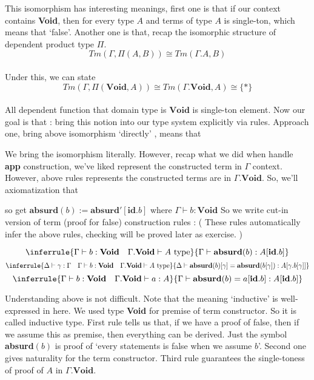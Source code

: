 \documentclass[12pt, a4paper, openany, twoside]{book}
\theoremstyle{definition}
\theoremstyle{remark}
\theoremstyle{plain}
\numberwithin{equation}{section}
\begin{document}
This isomorphism has interesting meanings, first one is that if our context contains \textbf{Void}, 
then for every type $A$ and terms of type $A$ is single-ton, which means that \lq false'. 
Another one is that, recap the isomorphic structure of dependent product type $\Pi$. 
\[Tm(\Gamma, \Pi(A, B)) \cong Tm(\Gamma.A, B)\]
\\
Under this, we can state 
\[Tm(\Gamma, \Pi(\mathbf{Void}, A)) \cong Tm(\Gamma.\mathbf{Void}, A) \cong \{*\}\]
\\
All dependent function that domain type is $\mathbf{Void}$ is single-ton element. 
Now our goal is that : bring this notion into our type system explicitly via rules. Approach one, 
bring above isomorphism \lq directly' , means that 
We bring the isomorphism literally. However, recap what we did when handle \textbf{app} construction, 
we've liked represent the constructed term in $\Gamma$ context. However, above rules 
represents the constructed terms are in $\Gamma.\mathbf{Void}$. So, we'll axiomatization that 
so get $\mathbf{absurd}(b) := \mathbf{absurd'}[\mathbf{id}.b]$ where $\Gamma \vdash b : \mathbf{Void}$
So we write cut-in version of term (proof for false) construction rules : ( These rules automatically infer the above rules, checking will be proved later as exercise. )

\begin{tcolorbox}[colback=yellow!10!white,colframe=green!75!black,title=Construction 3.2.4.]\hypertarget{const 3.2.4.}{}
\[
\inferrule
{
    \Gamma \vdash b : \mathbf{Void} \quad \Gamma.\mathbf{Void} \vdash A \text{ type}
}
{
    \Gamma \vdash \mathbf{absurd}(b) : A[\mathbf{id}.b]
}
\]
\[
\inferrule
{
    \Delta \vdash \gamma : \Gamma \quad \Gamma \vdash b : \mathbf{Void} \quad \Gamma.\mathbf{Void} \vdash A \text{ type}
}
{
    \Delta \vdash \mathbf{absurd}(b)[\gamma] = \mathbf{absurd}(b[\gamma]) : A[\gamma.b[\gamma]]
}
\]
\[
\inferrule
{
    \Gamma \vdash b : \mathbf{Void} \quad \Gamma.\mathbf{Void} \vdash a : A 
}
{
    \Gamma \vdash \mathbf{absurd}(b) = a[\mathbf{id}.b] : A[\mathbf{id}.b]
}
\]
\end{tcolorbox}
\vspace{4mm}
Understanding above is not difficult. Note that the meaning \lq inductive' is well-expressed in here. 
We used type \textbf{Void} for premise of term constructor. So it is called inductive type. 
First rule tells us that, if we have a proof of false, then if we assume this as premise, then 
everything can be derived. Just the symbol \textbf{absurd}$(b)$ is proof of \lq every statements is false when we assume $b$'. 
Second one gives naturality for the term constructor. Third rule guarantees the single-toness of proof of $A$ in $\Gamma.\mathbf{Void}$. 
\end{document}
